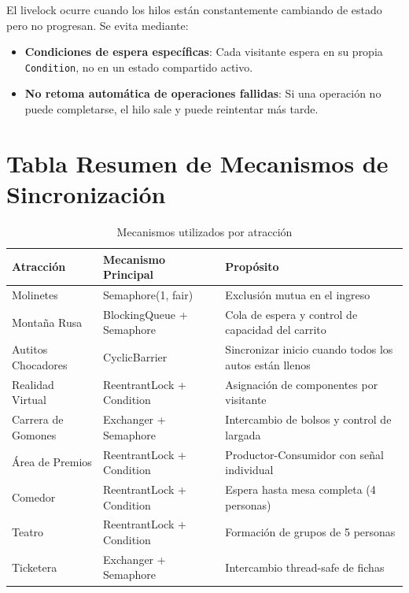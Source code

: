 \documentclass[12pt,a4paper]{article}
\begin{document}
El livelock ocurre cuando los hilos están constantemente cambiando de estado pero no progresan. Se evita mediante:

\begin{itemize}
    \item \textbf{Condiciones de espera específicas}: Cada visitante espera en su propia \texttt{Condition}, no en un estado compartido activo.
    \item \textbf{No retoma automática de operaciones fallidas}: Si una operación no puede completarse, el hilo sale y puede reintentar más tarde.
\end{itemize}

\newpage

\section{Tabla Resumen de Mecanismos de Sincronización}

\begin{table}[H]
    \centering
    \caption{Mecanismos utilizados por atracción}
    \begin{tabular}{|l|p{3.5cm}|p{5cm}|}
        \hline
        \textbf{Atracción} & \textbf{Mecanismo Principal} & \textbf{Propósito} \\
        \hline
        Molinetes & Semaphore(1, fair) & Exclusión mutua en el ingreso \\
        \hline
        Montaña Rusa & BlockingQueue + Semaphore & Cola de espera y control de capacidad del carrito \\
        \hline
        Autitos Chocadores & CyclicBarrier & Sincronizar inicio cuando todos los autos están llenos \\
        \hline
        Realidad Virtual & ReentrantLock + Condition & Asignación de componentes por visitante \\
        \hline
        Carrera de Gomones & Exchanger + Semaphore & Intercambio de bolsos y control de largada \\
        \hline
        Área de Premios & ReentrantLock + Condition & Productor-Consumidor con señal individual \\
        \hline
        Comedor & ReentrantLock + Condition & Espera hasta mesa completa (4 personas) \\
        \hline
        Teatro & ReentrantLock + Condition & Formación de grupos de 5 personas \\
        \hline
        Ticketera & Exchanger + Semaphore & Intercambio thread-safe de fichas \\
        \hline
    \end{tabular}
\end{table}
\end{document}
